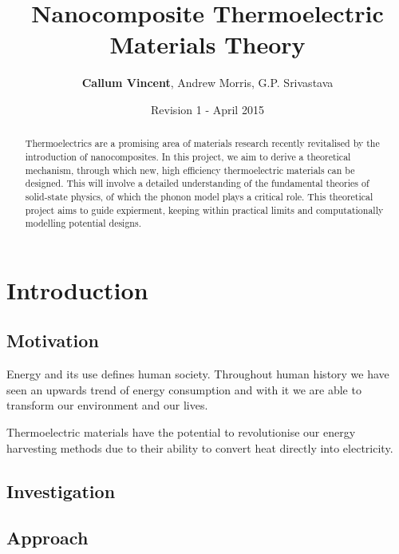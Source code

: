 \documentclass[12pt]{article}
\begin{document}
\title{Nanocomposite Thermoelectric Materials Theory}
\author{\textbf{Callum Vincent}, Andrew Morris, G.P. Srivastava}
\date{Revision 1 - April 2015}
\maketitle

\tableofcontents

\begin{abstract}

Thermoelectrics are a promising area of materials research recently revitalised by the introduction of nanocomposites. In this project, we aim to derive a theoretical mechanism, through which new, high efficiency thermoelectric materials can be designed. This will involve a detailed understanding of the fundamental theories of solid-state physics, of which the phonon model plays a critical role. This theoretical project aims to guide expierment, keeping within practical limits and computationally modelling potential designs.
\end{abstract}

\section{Introduction}
\subsection{Motivation}
Energy and its use defines human society. Throughout human history we have seen an upwards trend of energy consumption and with it we are able to transform our environment and our lives.

Thermoelectric materials have the potential to revolutionise our energy harvesting methods due to their ability to convert heat directly into electricity.

\subsection{Investigation}

\subsection{Approach}
\end{document}
